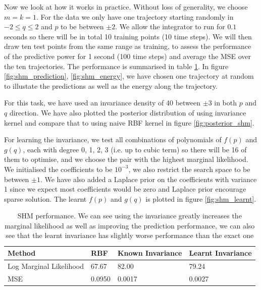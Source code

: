 \documentclass{statsmsc}
\begin{document}
Now we look at how it works in practice.
Without loss of generality, we choose $m=k=1$.
For the data we only have one trajectory starting randomly in $-2\le q\le2$ and $p$ to be between $\pm 2$.
We allow the integrator to run for $0.1$ seconds so there will be in total 10 training points (10 time steps). 
We will then draw ten test points from the same range as training, to assess the performance of the predictive power for 1 second (100 time steps) and average the MSE over the ten trajectories. 
The performance is summarised in table \ref{tab:shm_performance}.
In figure \ref{fig:shm_prediction}, \ref{fig:shm_energy}, we have chosen one trajectory at random to illustate the predictions as well as the energy along the trajectory.

For this task, we have used an invariance density of 40 between $\pm 3$ in both $p$ and $q$ direction.
We have also plotted the posterior distribution of using invariance kernel and compare that to using naive RBF kernel in figure \ref{fig:posterior_shm}.

For learning the invariance, we test all combinations of polynomials of $f(p)$ and $g(q)$, each with degree 0, 1, 2, 3 (i.e. up to cubic term) so there will be 16 of them to optimise, and we choose the pair with the highest marginal likelihood. 
We initialised the coefficients to be $10^{-3}$, we also restrict the search space to be between $\pm 1$.
We have also added a Laplace prior on the coefficients with variance 1 since we expect most coefficients would be zero and Laplace prior encourage sparse solution.
The learnt $f(p)$ and $g(q)$ is plotted in figure \ref{fig:shm_learnt}.

\begin{table}[H]
  \centering
  \begin{tabular}{l l l l }
\hline
Method           & RBF & Known Invariance&  Learnt Invariance\\
  \hline
Log Marginal Likelihood & 67.67 & 82.00 & 79.24 \\
MSE & 0.0950 & 0.0017 & 0.0027 \\
                    \hline
  \end{tabular}
  \caption{SHM performance. We can see using the invariance greatly increases the marginal likelihood as well as improving the prediction performance, we can also see that the learnt invariance has slightly worse performance than the exact one}
  \label{tab:shm_performance}
\end{table}
\end{document}
